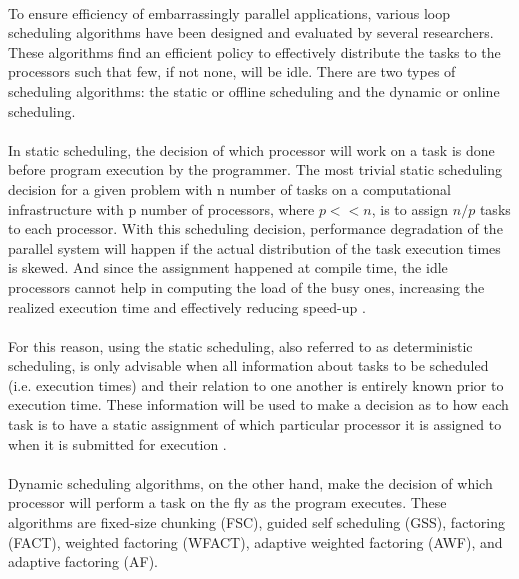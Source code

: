 \documentclass[10pt, twocolumn, letterpaper]{article}
\begin{document}
\paragraph{}
To ensure efficiency of embarrassingly parallel applications, various loop scheduling algorithms have been designed and evaluated by several researchers. These algorithms find an efficient policy to effectively distribute the tasks to the processors such that few, if not none, will be idle. There are two types of scheduling algorithms: the static or offline scheduling and the dynamic or online scheduling.

\paragraph{}
In static scheduling, the decision of which processor will work on a task is done before program execution by the programmer. The most trivial static scheduling decision for a given problem with n number of tasks on a computational infrastructure with p number of processors, where $p<<n$, is to assign $n/p$ tasks to each processor. With this scheduling decision, performance degradation of the parallel system will happen if the actual distribution of the task execution times is skewed. And since the assignment happened at compile time, the idle processors cannot help in computing the load of the busy ones, increasing the realized execution time and effectively reducing speed-up \cite{pabico}.

\paragraph{}
For this reason, using the static scheduling, also referred to as deterministic scheduling, is only advisable when all information about tasks to be scheduled (i.e. execution times) and their relation to one another is entirely known prior to execution time. These information will be used to make a decision as to how each task is to have a static assignment of which particular processor it is assigned to when it is submitted for execution \cite{el-rewini}.

\paragraph{}
Dynamic scheduling algorithms, on the other hand, make the decision of which processor will perform a task on the fly as the program executes. These algorithms are fixed-size chunking (FSC), guided self scheduling (GSS), factoring (FACT), weighted factoring (WFACT), adaptive weighted factoring (AWF), and adaptive factoring (AF).
\end{document}
